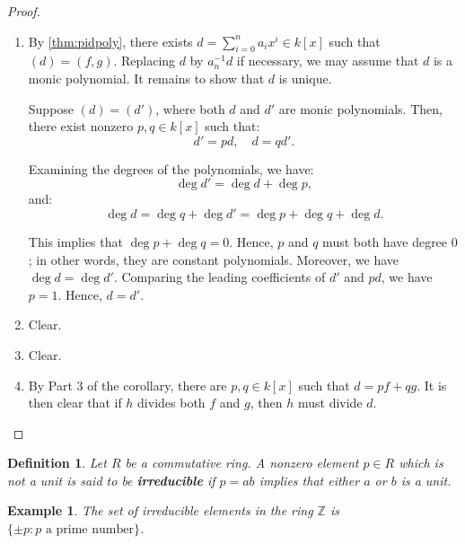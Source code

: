 \documentclass[a4paper,12pt]{report}
\newcounter{statement}
\numberwithin{statement}{chapter}
\newtheorem{defn}[statement]{Definition}
\newtheorem{eg}[statement]{\bf Example}
\numberwithin{equation}{chapter}
\numberwithin{section}{chapter}
\numberwithin{subsection}{section}
\begin{document}
\begin{proof}

\begin{enumerate}
\item 
By \cref{thm:pidpoly}, there exists $d = \sum_{i = 0}^n a_i x^i \in k[x]$ such that
$(d) = (f, g)$.  Replacing $d$ by $a_n^{-1} d$ if necessary, we may assume that $d$ is a monic polynomial.
It remains to show that $d$ is unique.




Suppose $(d) = (d')$, where both $d$ and $d'$ are monic polynomials.
Then, there exist nonzero $p, q \in k[x]$
such that:
\[
d' = pd,\quad d= qd'.
\]

Examining the degrees of the polynomials, we have:
\[
\deg d' = \deg d + \deg p,
\]
and:
\[
\deg d = \deg q + \deg d' = \deg p + \deg q + \deg d.
\]

This implies that $\deg p + \deg q = 0$.  Hence, $p$ and $q$ must both have degree $0$; in other words, they are
constant polynomials.  Moreover, we have $\deg d = \deg d'$.
Comparing the leading coefficients of $d'$ and $pd$, we have $p = 1$.
Hence, $d = d'$.


\item 
Clear.

\item 
Clear.

\item 
By Part 3 of the corollary, there are $p, q \in k[x]$ such that $d = pf + qg$.
It is then clear that if $h$ divides both $f$ and $g$, then $h$ must divide $d$.

\end{enumerate}

\end{proof}







\begin{defn}
Let $R$ be a commutative ring.
A nonzero element $p \in R$ which is not a unit is said to be  {\bf irreducible} 
if $p = ab$ implies that either $a$ or $b$ is a unit.
\end{defn}



\begin{eg}
The set of irreducible elements in the ring $\mathbb{Z}$ is $\{\pm p : p \text{ a prime number}\}$.
\end{eg}
\end{document}

